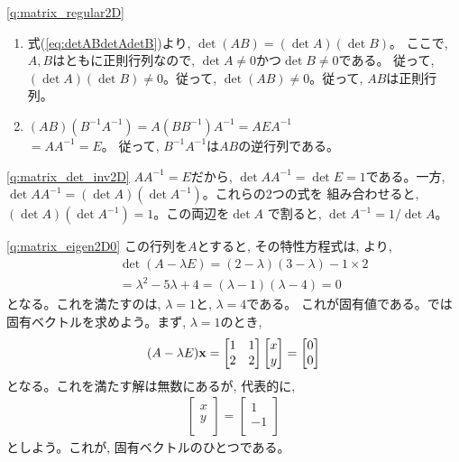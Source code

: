 %
\ref{q:matrix_regular2D}  
\begin{enumerate}
\item 式(\ref{eq:detABdetAdetB})より, $\det (AB) =(\det A)(\det B)$。
ここで, $A, B$はともに正則行列なので, $\det A\ne0$かつ$\det B\ne0$である。
従って, $(\det A)(\det B)\ne0$。従って, $\det (AB)\ne0$。従って, $AB$は正則行列。
\item $(AB)(B^{-1}A^{-1})=A(BB^{-1})A^{-1}=AEA^{-1}$\\$=AA^{-1}=E$。
従って, $B^{-1}A^{-1}$は$AB$の逆行列である。
\end{enumerate}
\mv

%
\ref{q:matrix_det_inv2D}  $AA^{-1}=E$だから, 
$\det AA^{-1}=\det E=1$である。一方,  
$\det AA^{-1}=(\det A)(\det A^{-1})$。これらの2つの式を
組み合わせると, $(\det A)(\det A^{-1})=1$。この両辺を$\det A$
で割ると, $\det A^{-1}=1/\det A$。
\mv


% 
\ref{q:matrix_eigen2D0}  この行列を$A$とすると, 
その特性方程式は, より, 
\begin{eqnarray*}
&&\det(A-\lambda E)=(2-\lambda)(3-\lambda)-1\times2\\
&&=\lambda^2-5\lambda+4=(\lambda-1)(\lambda-4)=0
\end{eqnarray*}
となる。これを満たすのは, $\lambda=1$と, $\lambda=4$である。
これが固有値である。では固有ベクトルを求めよう。まず, $\lambda=1$のとき, 
\begin{eqnarray}
(A-\lambda E){\bf x}=
\begin{bmatrix}
1          & 1 \\
2          & 2 \\
\end{bmatrix}
\begin{bmatrix}
x \\
y \\
\end{bmatrix}
=\begin{bmatrix}
0 \\
0 \\
\end{bmatrix}\end{eqnarray}
となる。これを満たす解は無数にあるが, 代表的に, 
\begin{eqnarray}
\begin{bmatrix}
x \\
y \\
\end{bmatrix}
=\begin{bmatrix}
1 \\
-1 \\
\end{bmatrix}
\end{eqnarray}
としよう。これが, 固有ベクトルのひとつである。

